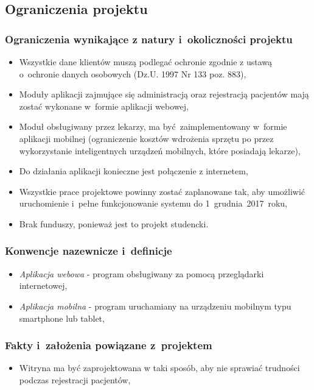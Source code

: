 \subsection{Ograniczenia projektu}

\subsubsection{Ograniczenia wynikające z natury i~okoliczności projektu}

\begin{itemize}
	\item Wszystkie dane klientów muszą podlegać ochronie zgodnie z ustawą o~ochronie danych osobowych (Dz.U. 1997 Nr 133 poz. 883),
	\item Moduły aplikacji zajmujące się administracją oraz rejestracją pacjentów mają zostać wykonane w~formie aplikacji webowej,
	\item Moduł obsługiwany przez lekarzy, ma być zaimplementowany w~formie aplikacji mobilnej (ograniczenie kosztów wdrożenia sprzętu po przez wykorzystanie inteligentnych urządzeń mobilnych, które posiadają lekarze),
	\item Do działania aplikacji konieczne jest połączenie z internetem,
	\item Wszystkie prace projektowe powinny zostać zaplanowane tak, aby umożliwić uruchomienie i~pełne funkcjonowanie systemu do 1~grudnia~2017~roku,
	\item Brak funduszy, ponieważ jest to projekt studencki.
\end{itemize}

\subsubsection{Konwencje nazewnicze i~definicje}
\begin{itemize}
	\item \textit{Aplikacja webowa} - program obsługiwany za pomocą przeglądarki internetowej,
	\item \textit{Aplikacja mobilna} - program uruchamiany na urządzeniu mobilnym typu smartphone lub tablet,
\end{itemize}

\subsubsection{Fakty i~założenia powiązane z~projektem}
\begin{itemize}
	\item Witryna ma być zaprojektowana w taki sposób, aby nie sprawiać trudności podczas rejestracji pacjentów,
\end{itemize}
